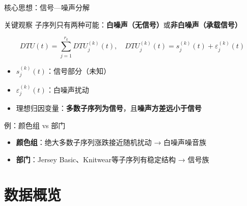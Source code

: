 \documentclass{beamer}
\begin{document}
\begin{frame}{核心思想：信号—噪声分解}
    \begin{block}{关键观察}
        子序列只有两种可能：\textbf{白噪声（无信号）}或\textbf{非白噪声（承载信号）}
    \end{block}
    
    \begin{equation*}
        DTU(t) = \sum_{j=1}^{r_k} DTU^{(k)}_j(t), \quad DTU^{(k)}_j(t) = s^{(k)}_j(t) + \varepsilon^{(k)}_j(t)
    \end{equation*}
    
    \begin{itemize}
        \item $s^{(k)}_j(t)$：信号部分（未知）
        \item $\varepsilon^{(k)}_j(t)$：白噪声扰动
        \item 理想归因变量：\textbf{多数子序列为信号}，且\textbf{噪声方差远小于信号}
    \end{itemize}
    
    \begin{block}{例：颜色组 vs 部门}
        \begin{itemize}
            \item \textbf{颜色组}：绝大多数子序列涨跌接近随机扰动 → 白噪声噪音族
            \item \textbf{部门}：Jersey Basic、Knitwear等子序列有稳定结构 → 信号族
        \end{itemize}
    \end{block}
\end{frame}

\section{数据概览}
\end{document}
